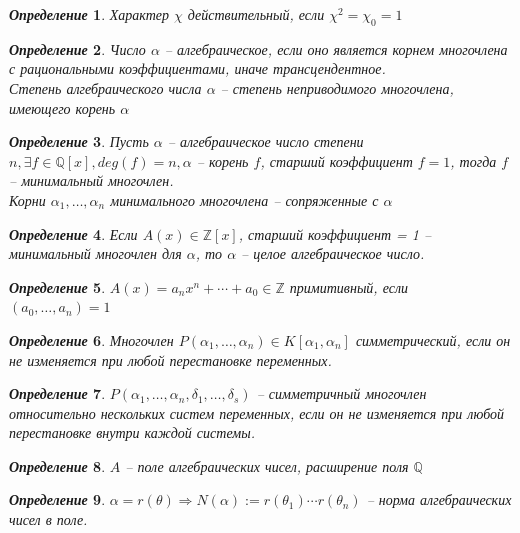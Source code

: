 \documentclass[a4paper,12pt]{article}
\newtheorem{deff2}{\textit{Определение}}
\newcommand{\TE}{\theta}
\newcommand{\AL}{\alpha}
\newcommand{\Ra}{\Rightarrow}
\newcommand{\bb}[1]{\mathbb{#1}}
\begin{document}
\begin{formbox}{}
\begin{deff2} Характер $\chi$ действительный, если $\chi^2 = \chi_0 = 1$
\end{deff2}
\end{formbox}
\begin{formbox}{}
\begin{deff2} Число $\AL$ -- алгебраическое, если оно является корнем многочлена с рациональными коэффициентами, иначе трансцендентное.\\
Степень алгебраического числа $\AL$ -- степень неприводимого многочлена, имеющего корень $\AL$
\end{deff2}
\end{formbox}
\begin{formbox}{}
\begin{deff2} Пусть $\AL$ -- алгебраическое число степени $n, \exists f\in\bb{Q}[x], deg(f) = n, \AL$ -- корень $f$, старший коэффициент $f = 1$, тогда $f$ -- минимальный многочлен.\\
Корни $\AL_1,\dots,\AL_n$ минимального многочлена -- сопряженные с $\AL$ 
\end{deff2}
\end{formbox}
\begin{formbox}{}
\begin{deff2} Если $A(x)\in\bb{Z}[x]$, старший коэффициент = 1 -- минимальный многочлен для $\AL$, то $\AL$ -- целое алгебраическое число.
\end{deff2}
\end{formbox}
\begin{formbox}{}
\begin{deff2} $A(x) = a_nx^n + \cdots + a_0\in\bb{Z}$ примитивный, если $(a_0,\dots,a_n) = 1$
\end{deff2}
\end{formbox}
\begin{formbox}{}
\begin{deff2} Многочлен $P(\AL_1,\dots,\AL_n) \in K[\AL_1, \AL_n]$ симметрический, если он не изменяется при любой перестановке переменных.
\end{deff2}
\end{formbox}
\begin{formbox}{}
\begin{deff2} $P(\AL_1, \dots, \AL_n, \delta_1,\dots,\delta_s)$ -- симметричный многочлен относительно нескольких систем переменных, если он не изменяется при любой перестановке внутри каждой системы.
\end{deff2}
\end{formbox}
\begin{formbox}{}
\begin{deff2} $A$ -- поле алгебраических чисел, расширение поля $\bb{Q}$
\end{deff2}
\end{formbox}
\begin{formbox}{}
\begin{deff2} $\AL = r(\TE)\Ra N(\AL) := r(\TE_1)\cdots r(\TE_n)$ -- норма алгебраических чисел в поле.
\end{deff2}
\end{formbox}
\end{document}
